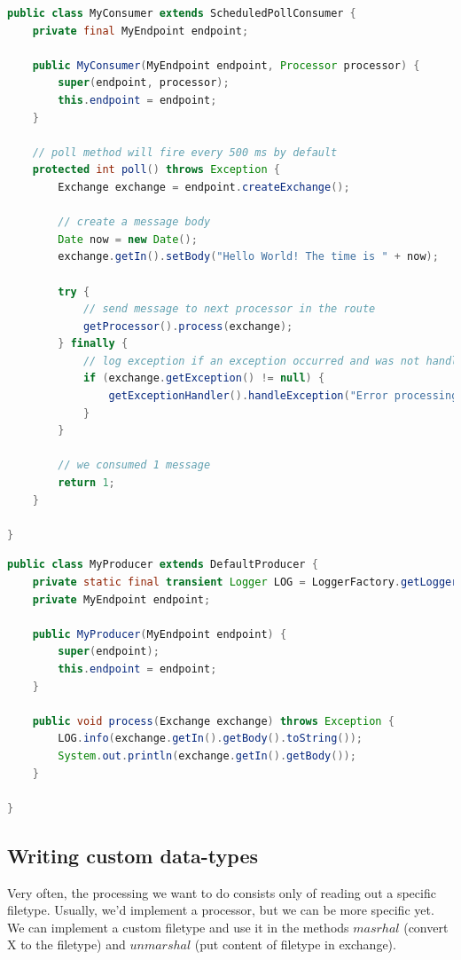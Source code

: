 \begin{lstlisting}[language=java]
public class MyConsumer extends ScheduledPollConsumer {
    private final MyEndpoint endpoint;

    public MyConsumer(MyEndpoint endpoint, Processor processor) {
        super(endpoint, processor);
        this.endpoint = endpoint;
    }

    // poll method will fire every 500 ms by default 
    protected int poll() throws Exception {
        Exchange exchange = endpoint.createExchange();

        // create a message body
        Date now = new Date();
        exchange.getIn().setBody("Hello World! The time is " + now);

        try {
            // send message to next processor in the route
            getProcessor().process(exchange);
        } finally {
            // log exception if an exception occurred and was not handled
            if (exchange.getException() != null) {
                getExceptionHandler().handleException("Error processing exchange", exchange, exchange.getException());
            }
        }

        // we consumed 1 message
        return 1;
    }

}
\end{lstlisting}

\begin{lstlisting}[language=java]
public class MyProducer extends DefaultProducer {
    private static final transient Logger LOG = LoggerFactory.getLogger(MyProducer.class);
    private MyEndpoint endpoint;

    public MyProducer(MyEndpoint endpoint) {
        super(endpoint);
        this.endpoint = endpoint;
    }

    public void process(Exchange exchange) throws Exception {
    	LOG.info(exchange.getIn().getBody().toString());
        System.out.println(exchange.getIn().getBody());    
    }

}
\end{lstlisting}

\subsection{Writing custom data-types}

Very often, the processing we want to do consists only of reading out a specific filetype. 
Usually, we'd implement a processor, but we can be more specific yet. We can implement a custom filetype and use it in the methods $masrhal$ (convert X to the filetype) and $unmarshal$ (put content of filetype in exchange).

